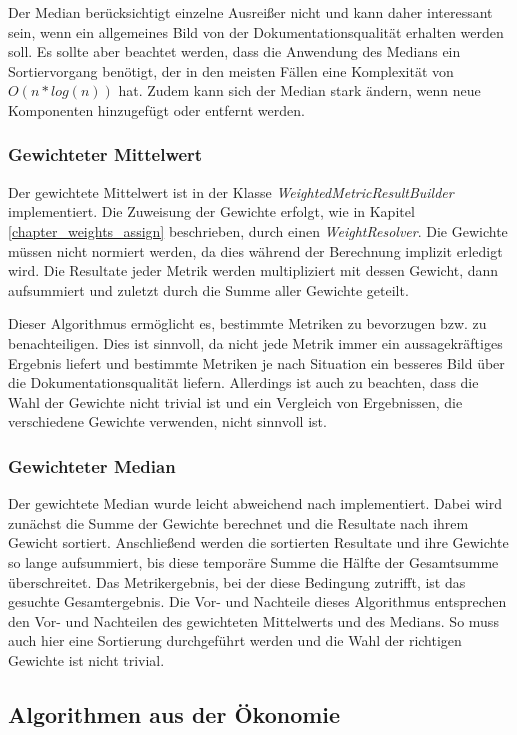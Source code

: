 Der Median berücksichtigt einzelne Ausreißer nicht und kann daher interessant sein, wenn ein allgemeines Bild von der Dokumentationsqualität erhalten werden soll. Es sollte aber beachtet werden, dass die Anwendung des Medians ein Sortiervorgang benötigt, der in den meisten Fällen eine Komplexität von $O(n*log(n))$ hat.  Zudem kann sich der Median stark ändern, wenn neue Komponenten hinzugefügt oder entfernt werden.


\subsubsection{Gewichteter Mittelwert}
Der gewichtete Mittelwert ist in der Klasse \textit{WeightedMetricResultBuilder} implementiert. Die Zuweisung der Gewichte erfolgt, wie in Kapitel \ref{chapter_weights_assign} beschrieben, durch einen \textit{WeightResolver}. Die Gewichte müssen nicht normiert werden, da dies während der Berechnung implizit erledigt wird. Die Resultate jeder Metrik werden multipliziert mit dessen Gewicht, dann aufsummiert und zuletzt durch die Summe aller Gewichte geteilt. 


Dieser Algorithmus ermöglicht es, bestimmte Metriken zu bevorzugen bzw. zu benachteiligen. Dies ist sinnvoll, da nicht jede Metrik immer ein aussagekräftiges Ergebnis liefert und bestimmte Metriken je nach Situation ein besseres Bild über die Dokumentationsqualität liefern. Allerdings ist auch zu beachten, dass die Wahl der Gewichte nicht trivial ist und ein Vergleich von Ergebnissen, die verschiedene Gewichte verwenden, nicht sinnvoll ist.

\subsubsection{Gewichteter Median}
Der gewichtete Median wurde leicht abweichend nach \cite[S. 37]{YAGER199835} implementiert. Dabei wird zunächst die Summe der Gewichte berechnet und die Resultate nach ihrem Gewicht sortiert. Anschließend werden die sortierten Resultate und ihre Gewichte so lange aufsummiert, bis diese temporäre Summe die Hälfte der Gesamtsumme überschreitet. Das Metrikergebnis, bei der diese Bedingung zutrifft, ist das gesuchte Gesamtergebnis. Die Vor- und Nachteile dieses Algorithmus entsprechen den Vor- und Nachteilen des gewichteten Mittelwerts und des Medians. So muss auch hier eine Sortierung durchgeführt werden und die Wahl der richtigen Gewichte ist nicht trivial. 

 \subsection{Algorithmen aus der Ökonomie}
 
